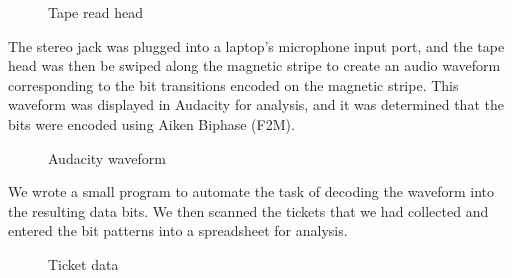 \documentclass[fontsize=12pt]{scrartcl}
\begin{document}
\begin{figure}[ht!]
\centering
{}
\caption{Tape read head}
\end{figure}

The stereo jack was plugged into a laptop's microphone input port, and the tape head was then be swiped along the magnetic stripe to create an audio waveform corresponding to the bit transitions encoded on the magnetic stripe. This waveform was displayed in Audacity for analysis, and it was determined that the bits were encoded using Aiken Biphase (F2M).

\begin{figure}[ht!]
\centering
{}
\caption{Audacity waveform}
\end{figure}

We wrote a small program to automate the task of decoding the waveform into the resulting data bits. We then scanned the tickets that we had collected and entered the bit patterns into a spreadsheet for analysis.


\begin{figure}[ht!]
\centering
{}
\caption{Ticket data}
\end{figure}
\end{document}
